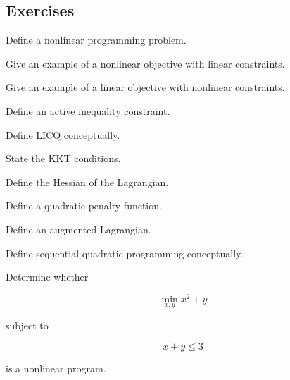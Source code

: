 \subsection{Exercises}
\label{subsec:nonlinear-programming-exercises}

\begin{exercise}[1]
Define a nonlinear programming problem.
\end{exercise}

\begin{exercise}[1]
Give an example of a nonlinear objective with linear constraints.
\end{exercise}

\begin{exercise}[1]
Give an example of a linear objective with nonlinear constraints.
\end{exercise}

\begin{exercise}[1]
Define an active inequality constraint.
\end{exercise}

\begin{exercise}[1]
Define LICQ conceptually.
\end{exercise}

\begin{exercise}[1]
State the KKT conditions.
\end{exercise}

\begin{exercise}[1]
Define the Hessian of the Lagrangian.
\end{exercise}

\begin{exercise}[1]
Define a quadratic penalty function.
\end{exercise}

\begin{exercise}[1]
Define an augmented Lagrangian.
\end{exercise}

\begin{exercise}[1]
Define sequential quadratic programming conceptually.
\end{exercise}

\begin{exercise}[2]
Determine whether

\[
\min_{x,y}
x^2+y
\]

subject to

\[
x+y\leq3
\]

is a nonlinear program.
\end{exercise}


